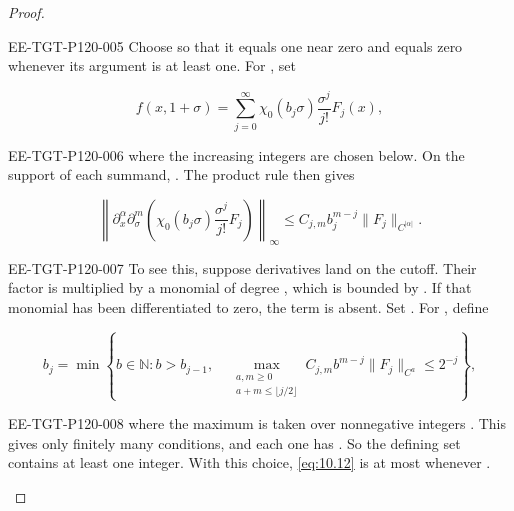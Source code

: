 \begin{proof}
\begin{EESegment}{EE-TGT-P120-005}
Choose  so that it equals one near zero and
equals zero whenever its argument is at least one. For
, set
\end{EESegment}
\begin{equation}
f(x,1+\sigma)=\sum_{j=0}^\infty\chi_0(b_j\sigma)\frac{\sigma^j}{j!}F_j(x),
\tag{10.11}\label{eq:10.11}
\end{equation}
\begin{EESegment}{EE-TGT-P120-006}
where the increasing integers  are chosen below. On the support of
each summand, . The product rule then gives
\end{EESegment}
\begin{equation}
\left\|\partial_x^\alpha\partial_\sigma^m
 \left(\chi_0(b_j\sigma)\frac{\sigma^j}{j!}F_j\right)\right\|_\infty
\leq C_{j,m}b_j^{m-j}\|F_j\|_{C^{|\alpha|}}.
\tag{10.12}\label{eq:10.12}
\end{equation}
\begin{EESegment}{EE-TGT-P120-007}
To see this, suppose  derivatives land on the cutoff. Their factor
 is multiplied by a monomial of degree
, which is bounded by
. If that monomial has been differentiated to zero, the term
is absent. Set . For , define
\end{EESegment}
\[
b_j=\min\left\{b\in\mathbb N:b>b_{j-1},\quad
\max_{\substack{a,m\geq0\\a+m\leq\lfloor j/2\rfloor}}
C_{j,m}b^{m-j}\|F_j\|_{C^a}\leq2^{-j}\right\},
\]
\begin{EESegment}{EE-TGT-P120-008}
where the maximum is taken over nonnegative integers . This gives only
finitely many conditions, and each one has . So the defining set
contains at least one integer. With this choice, \eqref{eq:10.12} is at most
 whenever
.
\end{EESegment}


\end{proof}

